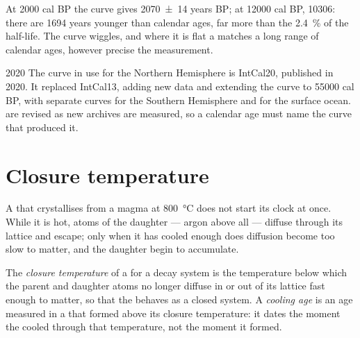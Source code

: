 At \num{2000} cal BP the curve gives \num[uncertainty-mode=separate]{2070 \pm 14} years BP; at
\num{12000} cal BP, \num{10306}:  there are \num{1694} years
younger than calendar ages, far more than the \qty{2.4}{\percent} of the
half-life. The curve wiggles, and where it is flat a  matches a
long range of calendar ages, however precise the measurement.

\begin{dated}{2020}
The curve in use for the Northern Hemisphere is IntCal20, published in 2020. It
replaced IntCal13, adding new data and extending the curve to \num{55000} cal BP,
with separate curves for the Southern Hemisphere and for the surface ocean.
 are revised as new archives are measured, so a calendar age
must name the curve that produced it.
\end{dated}

\section{Closure temperature}\label{sec:b1:radiometric-methods:closure}

A  that crystallises from a magma at \qty{800}{\celsius} does not start
its clock at once. While it is hot, atoms of the daughter --- argon above all ---
diffuse through its lattice and escape; only when it has cooled enough does
diffusion become too slow to matter, and the daughter begin to accumulate.

\begin{definition}\label{def:b1:radiometric-methods:closure}
The \emph{closure temperature} of a  for a
decay system is the temperature below which the parent and daughter atoms no
longer diffuse in or out of its lattice fast enough to matter, so that the
 behaves as a closed system. A \emph{cooling age} is an
age measured in a  that formed above its closure temperature: it dates
the moment the  cooled through that temperature, not the moment it
formed.
\end{definition}

